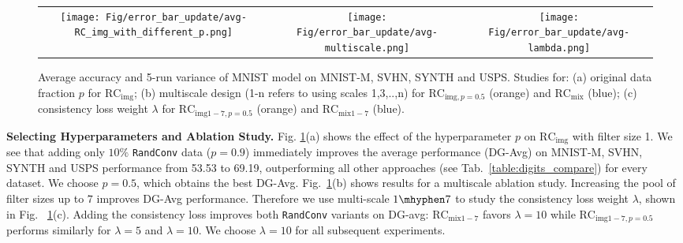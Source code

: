 \documentclass{article} \usepackage{iclr2021_conference,times}
\newcommand{\RandConv}{\texttt{RandConv}}
\begin{document}
\begin{figure}[b]
\begin{center}
\setlength{\tabcolsep}{0.00cm}
		\newcommand\cwidth{0.4\textwidth}
		\begin{adjustbox}{max width=\textwidth}
			\begin{tabular}{ccc}
\texttt{[image: Fig/error\_bar\_update/avg-RC\_img\_with\_different\_p.png]} &
				\texttt{[image: Fig/error\_bar\_update/avg-multiscale.png]} &
				\texttt{[image: Fig/error\_bar\_update/avg-lambda.png]}\\
			\end{tabular}
		\end{adjustbox}
	\end{center}
	\vspace{-4mm}
	\caption{Average accuracy and 5-run variance of MNIST model on MNIST-M, SVHN, SYNTH and USPS. Studies for: (a) original data fraction $p$ for $\text{RC}_{\text{img}}$; (b) multiscale design (1-n refers to using scales {1,3,..,n}) for $\text{RC}_{\text{img},p=0.5}$ (orange) and $\text{RC}_{\text{mix}}$ (blue); (c) consistency loss weight $\lambda$ for  $\text{RC}_{\text{img}1-7,p=0.5}$ (orange) and $\text{RC}_{\text{mix}1-7}$ (blue).}  
\label{fig:digit_ablation}
\end{figure}

\textbf{Selecting Hyperparameters and Ablation Study.} Fig. \ref{fig:digit_ablation}(a) shows the effect of the hyperparameter $p$ on $\text{RC}_{\text{img}}$ with filter size 1. We see that  adding only $10\%$ {\RandConv} data ($p=0.9$) immediately improves the average performance (DG-Avg) on MNIST-M, SVHN, SYNTH and USPS performance from 53.53 to 69.19, outperforming all other approaches (see Tab.~\ref{table:digits_compare}) for every dataset. We choose $p=0.5$, which obtains the best DG-Avg. Fig.~\ref{fig:digit_ablation}(b) shows results for a multiscale ablation study. Increasing the pool of filter sizes up to $7$ improves DG-Avg performance. Therefore we use multi-scale $1\mhyphen7$ to study the consistency loss weight $\lambda$, shown in Fig. ~\ref{fig:digit_ablation}(c). Adding the consistency loss improves both {\RandConv} variants on 
DG-avg: $\text{RC}_{\text{mix}1-7}$ favors $\lambda=10$ while $\text{RC}_{\text{img}1-7,p=0.5}$ performs similarly for $\lambda=5$ and $\lambda=10$. We choose $\lambda=10$ for all subsequent experiments.
\end{document}
